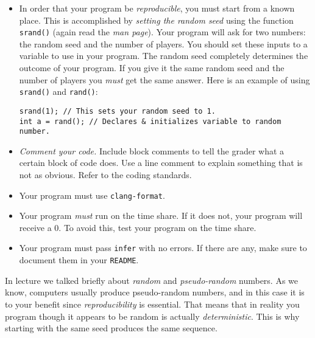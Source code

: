 \documentclass{article}
\begin{document}
\begin{itemize}
\item In order that your program be \emph{reproducible}, you must start from a
known place. This is accomplished by \emph{setting the random seed}
using the function \texttt{srand()} (again read the \emph{man page}).
Your program will ask for two numbers: the random seed and the
number of players. You should set these inputs to a variable to use
in your program. The random seed completely determines the outcome of your program. If you give it
the same random seed and the number of players you \emph{must} get
the same answer. Here is an example of using \texttt{srand()} and
\texttt{rand()}:
\begin{lstlisting}
srand(1); // This sets your random seed to 1.
int a = rand(); // Declares & initializes variable to random number.
\end{lstlisting}

\item \emph{Comment your code.} Include block comments to tell the grader what a certain block of code does. Use a line comment to explain something that is not as obvious. Refer to the coding standards.

\item Your program must use \texttt{clang-format}.

\item Your program \emph{must} run on the time share. If it does not, your program will receive a 0. To avoid this, test your program on the time share.

\item Your program must pass \texttt{infer} with no errors. If there are any, make sure to document them in your \texttt{README}.

\end{itemize}


In lecture we talked briefly about \emph{random} and \emph{pseudo-random}
numbers. As we know, computers usually produce pseudo-random numbers, and in this case
it is to your benefit since \emph{reproducibility} is essential. That means
that in reality you program though it appears to be random is actually
\emph{deterministic}. This is why starting with the same seed produces the same sequence.
\end{document}
